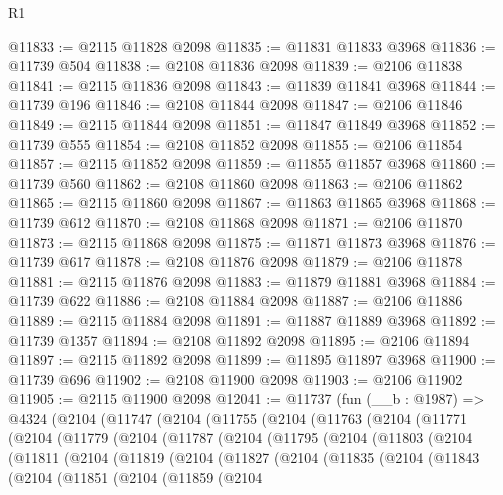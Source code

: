 \begin{lexlean}{R1}
\begin{coremodule}
@11833 := @2115 @11828 @2098
@11835 := @11831 @11833 @3968
@11836 := @11739 @504
@11838 := @2108 @11836 @2098
@11839 := @2106 @11838
@11841 := @2115 @11836 @2098
@11843 := @11839 @11841 @3968
@11844 := @11739 @196
@11846 := @2108 @11844 @2098
@11847 := @2106 @11846
@11849 := @2115 @11844 @2098
@11851 := @11847 @11849 @3968
@11852 := @11739 @555
@11854 := @2108 @11852 @2098
@11855 := @2106 @11854
@11857 := @2115 @11852 @2098
@11859 := @11855 @11857 @3968
@11860 := @11739 @560
@11862 := @2108 @11860 @2098
@11863 := @2106 @11862
@11865 := @2115 @11860 @2098
@11867 := @11863 @11865 @3968
@11868 := @11739 @612
@11870 := @2108 @11868 @2098
@11871 := @2106 @11870
@11873 := @2115 @11868 @2098
@11875 := @11871 @11873 @3968
@11876 := @11739 @617
@11878 := @2108 @11876 @2098
@11879 := @2106 @11878
@11881 := @2115 @11876 @2098
@11883 := @11879 @11881 @3968
@11884 := @11739 @622
@11886 := @2108 @11884 @2098
@11887 := @2106 @11886
@11889 := @2115 @11884 @2098
@11891 := @11887 @11889 @3968
@11892 := @11739 @1357
@11894 := @2108 @11892 @2098
@11895 := @2106 @11894
@11897 := @2115 @11892 @2098
@11899 := @11895 @11897 @3968
@11900 := @11739 @696
@11902 := @2108 @11900 @2098
@11903 := @2106 @11902
@11905 := @2115 @11900 @2098
@12041 := @11737
    (fun (__b : @1987) =>
    @4324
      (@2104
        (@11747
          (@2104
            (@11755
              (@2104
                (@11763
                  (@2104
                    (@11771
                      (@2104
                        (@11779
                          (@2104
                            (@11787
                              (@2104
                                (@11795
                                  (@2104
                                    (@11803
                                      (@2104
                                        (@11811
                                          (@2104
                                            (@11819
                                              (@2104
                                                (@11827
                                                  (@2104
                                                    (@11835
                                                      (@2104
                                                        (@11843
                                                          (@2104
                                                            (@11851
                                                              (@2104
                                                                (@11859
                                                                  (@2104

\end{coremodule}
\end{lexlean}
